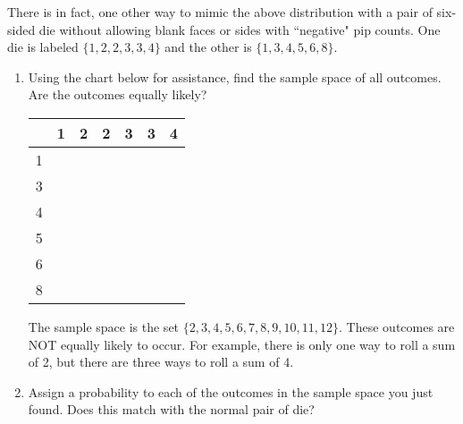 \documentclass{ccg-topic}
\begin{document}
    \begin{todo}
        \label{todo:sicherman_dice}
         There is in fact, one other way to mimic the above distribution with a pair of six-sided die without allowing blank faces or sides with ``negative" pip counts. One die is labeled $\{1,2,2,3,3,4\}$ and the other is $\{1,3,4,5,6,8\}$.
        
        	\begin{enumerate}
        	\item Using the chart below for assistance, find the sample space of all outcomes. Are the outcomes equally likely? 
        
        	\begin{center}
        \begin{tabular}{|c||c|c|c|c|c|c|}
        \hline
         & \hspace{.15in} 1 \hspace{.15in} & \hspace{.15in} 2 \hspace{.15in} & \hspace{.15in} 2 \hspace{.15in} & \hspace{.15in} 3 \hspace{.15in} & \hspace{.15in} 3 \hspace{.15in} & \hspace{.15in} 4 \hspace{.15in} \\
         \hline
         \hline
         1 & & & & & & \\
         \hline
         3 & & & & & & \\
         \hline
         4 & & & & & & \\
         \hline
         5 & & & & & & \\
         \hline
         6 & & & & & & \\
         \hline
         8 & & & & & & \\
         \hline    
        \end{tabular}
        \end{center}
        
        	{\answer The sample space is the set $\{2, 3, 4, 5, 6, 7, 8, 9, 10, 11, 12\}$.  These outcomes are NOT equally likely to occur.  For example, there is only one way to roll a sum of 2, but there are three ways to roll a sum of 4.} 
        
        	\item Assign a probability to each of the outcomes in the sample space you just found.  Does this match with the normal pair of die? 
        

\end{enumerate}
\end{todo}
\end{document}
